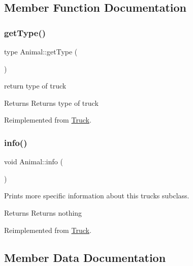 \subsection{Member Function Documentation}
\mbox{\label{class_animal_a6e7f8a4a7e8e9571218e3650a0803c03}} 
\subsubsection{\texorpdfstring{get\+Type()}{getType()}}
{\footnotesize\ttfamily type Animal\+::get\+Type (\begin{DoxyParamCaption}{ }\end{DoxyParamCaption})\hspace{0.3cm}{\ttfamily [virtual]}}



return type of truck 

\begin{DoxyReturn}{Returns}
Returns type of truck 
\end{DoxyReturn}


Reimplemented from \hyperlink{class_truck_a24406caf4d09be7f3eff069ce6bc015b}{Truck}.

\mbox{\label{class_animal_a1e99083943239209f4fbe79380ea5991}} 
\subsubsection{\texorpdfstring{info()}{info()}}
{\footnotesize\ttfamily void Animal\+::info (\begin{DoxyParamCaption}{ }\end{DoxyParamCaption})\hspace{0.3cm}{\ttfamily [virtual]}}



Prints more specific information about this truck\textquotesingle{}s subclass. 

\begin{DoxyReturn}{Returns}
Returns nothing 
\end{DoxyReturn}


Reimplemented from \hyperlink{class_truck_a38f09eab2822524e355ecf6d0a13f7de}{Truck}.



\subsection{Member Data Documentation}
\mbox{\label{class_animal_a6109c3aa008a556ed43318ae4bcf33a2}} 
